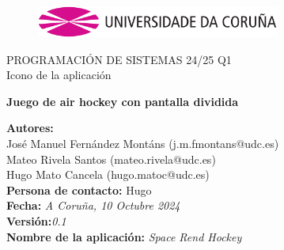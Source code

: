 \documentclass[a4paper,openright,12pt]{article}
\begin{document}
\begin{titlepage}

\begin{center}
\vspace*{-1in}
\begin{figure}[htb]
\begin{center}
\includegraphics[width=8cm]{udc.eps}
\end{center}
\end{figure}

\vspace*{1in}
PROGRAMACIÓN DE SISTEMAS 24/25 Q1\\
Icono de la aplicación\\
\vspace*{1in}
\begin{Large}
\textbf{Juego de air hockey con pantalla dividida} \\
\end{Large}

\vspace*{3in}

\begin{large}
\raggedleft
\textbf{Autores:}\\ José Manuel Fernández Montáns (j.m.fmontans@udc.es) \\
Mateo Rivela Santos (mateo.rivela@udc.es)\\
Hugo Mato Cancela (hugo.matoc@udc.es)\\
\textbf{Persona de contacto:} Hugo\\
\textbf{Fecha:}\textit{ A Coruña, 10 Octubre 2024}\\
\textbf{Versión:}\textit{0.1}\\
\textbf{Nombre de la aplicación:} \textit{Space Rend Hockey}\\
\end{large}

\end{center}
\end{titlepage} 

\newpage

\end{document}
